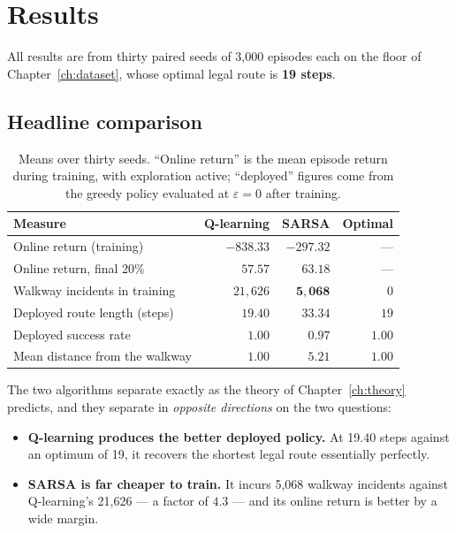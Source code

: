 \chapter{Results}
\label{ch:results}

All results are from thirty paired seeds of 3{,}000 episodes each on the floor of
Chapter~\ref{ch:dataset}, whose optimal legal route is \textbf{19 steps}.

\section{Headline comparison}

\begin{table}[ht]
\centering
\caption[Headline results]{Means over thirty seeds. ``Online return'' is the mean episode return
during training, with exploration active; ``deployed'' figures come from the greedy policy
evaluated at $\varepsilon = 0$ after training.}
\label{tab:headline}
\begin{tabular}{lrrr}
\toprule
\textbf{Measure} & \textbf{Q-learning} & \textbf{SARSA} & \textbf{Optimal} \\
\midrule
Online return (training)        & $-838.33$  & $\mathbf{-297.32}$ & --- \\
Online return, final 20\%       & $57.57$    & $\mathbf{63.18}$   & --- \\
Walkway incidents in training   & $21{,}626$ & $\mathbf{5{,}068}$ & $0$ \\
Deployed route length (steps)   & $\mathbf{19.40}$ & $33.34$      & $19$ \\
Deployed success rate           & $1.00$     & $0.97$             & $1.00$ \\
Mean distance from the walkway  & $1.00$     & $\mathbf{5.21}$    & $1.00$ \\
\bottomrule
\end{tabular}
\end{table}

The two algorithms separate exactly as the theory of Chapter~\ref{ch:theory} predicts, and they
separate in \emph{opposite directions} on the two questions:

\begin{itemize}
\item \textbf{Q-learning produces the better deployed policy.} At 19.40 steps against an optimum
      of 19, it recovers the shortest legal route essentially perfectly.
\item \textbf{SARSA is far cheaper to train.} It incurs 5{,}068 walkway incidents against
      Q-learning's 21{,}626 --- a factor of $4.3$ --- and its online return is better by a wide
      margin.
\end{itemize}

